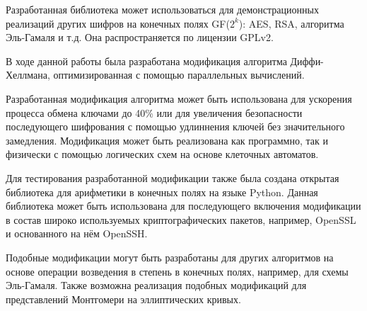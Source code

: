 \documentclass[times,specification,annotation]{itmo-student-thesis}
\begin{document}
Разработанная библиотека может использоваться для демонстрационных реализаций других шифров на конечных полях GF($2^k$):
AES, RSA, алгоритма Эль-Гамаля и т.д.
Она распространяется по лицензии GPLv2.

\startconclusionpage

В ходе данной работы была разработана модификация алгоритма Диффи-Хеллмана, оптимизированная с помощью параллельных вычислений.

Разработанная модификация алгоритма может быть использована для ускорения процесса обмена ключами до 40\% или для
увеличения безопасности последующего шифрования с помощью удлиннения ключей без значительного замедления.
Модификация может быть реализована как программно, так и физически с помощью логических схем на основе клеточных автоматов.

Для тестирования разработанной модификации также была создана открытая библиотека для арифметики в конечных полях на языке Python.
Данная библиотека может быть использована для последующего включения модификации в состав широко используемых
криптографических пакетов, например, OpenSSL и основанного на нём OpenSSH.

Подобные модификации могут быть разработаны для других алгоритмов на основе операции возведения в степень в конечных полях,
например, для схемы Эль-Гамаля.
Также возможна реализация подобных модификаций для представлений Монтгомери на эллиптических кривых.

\printmainbibliography
\end{document}
